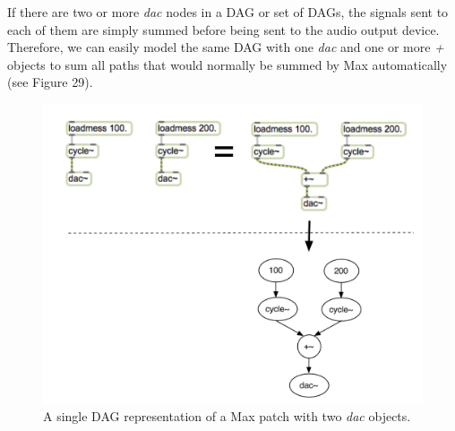\documentclass[12pt]{report} 	%
\numberwithin{figure}{chapter}
\numberwithin{table}{chapter}
\numberwithin{equation}{chapter}
\begin{document}
\begin{flushleft}
If there are two or more \textit{dac\texttildelow{}} nodes in a DAG or set of DAGs, the signals sent to each of them are simply summed before being sent to the audio output device. Therefore, we can easily model the same DAG with one \textit{dac\texttildelow{}} and one or more \textit{+\texttildelow{}} objects to sum all paths that would normally be summed by Max automatically (see Figure 29). 
\begin{figure}[h!]
\begin{center}
\includegraphics[scale=0.7]{MaxDAGs2DACs}
\caption[A single DAG with two \textit{dac\texttildelow{}} objects]{A single DAG representation of a Max patch with two \textit{dac\texttildelow{}} objects.}
\end{center}
\end{figure}


\end{flushleft}
\end{document}
